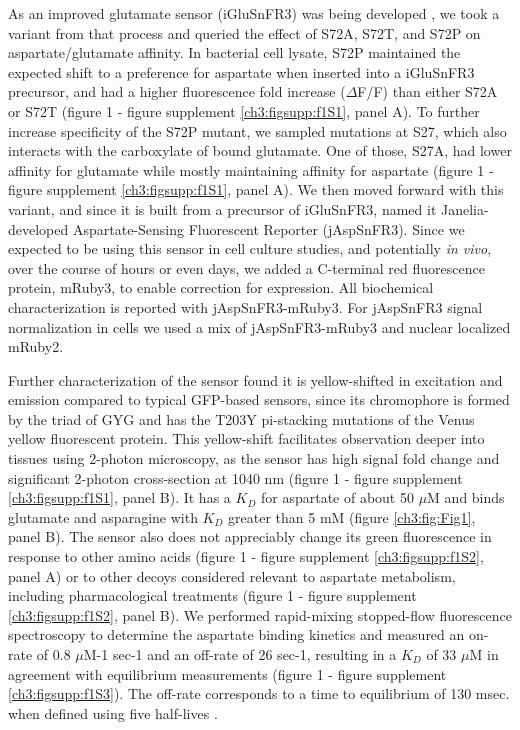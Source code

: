 As an improved glutamate sensor (iGluSnFR3) was being developed \cite{Aggarwal2023-pi}, we took a variant from that process and queried the effect of S72A, S72T, and S72P on aspartate/glutamate affinity.
In bacterial cell lysate, S72P maintained the expected shift to a preference for aspartate when inserted into a iGluSnFR3 precursor, and had a higher fluorescence fold increase ($\Delta$F/F) than either S72A or S72T (figure 1 - figure supplement \ref{ch3:figsupp:f1S1}, panel A).
To further increase specificity of the S72P mutant, we sampled mutations at S27, which also interacts with the carboxylate of bound glutamate.
One of those, S27A, had lower affinity for glutamate while mostly maintaining affinity for aspartate (figure 1 - figure supplement \ref{ch3:figsupp:f1S1}, panel A).
We then moved forward with this variant, and since it is built from a precursor of iGluSnFR3, named it Janelia-developed Aspartate-Sensing Fluorescent Reporter (jAspSnFR3).
Since we expected to be using this sensor in cell culture studies, and potentially \textit{in vivo}, over the course of hours or even days, we added a C-terminal red fluorescence protein, mRuby3, to enable correction for expression.
All biochemical characterization is reported with jAspSnFR3-mRuby3.
For jAspSnFR3 signal normalization in cells we used a mix of jAspSnFR3-mRuby3 and nuclear localized mRuby2.

Further characterization of the sensor found it is yellow-shifted in excitation and emission compared to typical GFP-based sensors, since its chromophore is formed by the triad of GYG and has the T203Y pi-stacking mutations of the Venus yellow fluorescent protein.
This yellow-shift facilitates observation deeper into tissues using 2-photon microscopy, as the sensor has high signal fold change and significant 2-photon cross-section at 1040 nm (figure 1 - figure supplement \ref{ch3:figsupp:f1S1}, panel B).
It has a $K_D$ for aspartate of about 50 $\mu$M and binds glutamate and asparagine with $K_D$ greater than 5 mM (figure \ref{ch3:fig:Fig1}, panel B).
The sensor also does not appreciably change its green fluorescence in response to other amino acids (figure 1 - figure supplement \ref{ch3:figsupp:f1S2}, panel A) or to other decoys considered relevant to aspartate metabolism, including pharmacological treatments (figure 1 - figure supplement \ref{ch3:figsupp:f1S2}, panel B).
We performed rapid-mixing stopped-flow fluorescence spectroscopy to determine the aspartate binding kinetics and measured an on-rate of 0.8 $\mu$M-1 sec-1 and an off-rate of 26 sec-1, resulting in a $K_D$ of 33 $\mu$M in agreement with equilibrium measurements (figure 1 - figure supplement \ref{ch3:figsupp:f1S3}).
The off-rate corresponds to a time to equilibrium of 130 msec. when defined using five half-lives \cite{Jarmoskaite2020-pj}.


